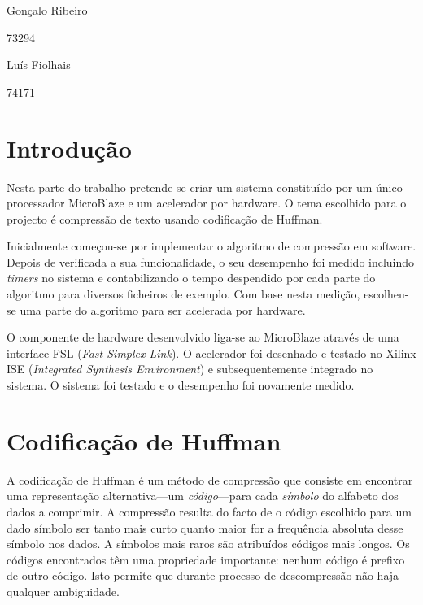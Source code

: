 \documentclass[a4paper]{article}
\begin{document}
	
	
	
	\trSetAuthors
		{
		\begin{center}
		Gonçalo Ribeiro
		
		73294
		\end{center}
		}{
		\begin{center}
		Luís Fiolhais
		
		74171
		\end{center}
		}

	
	\trMakeCover
	
	\tableofcontents
	\pagebreak
	
	\section{Introdução}
	
	Nesta parte do trabalho pretende-se criar um sistema constituído por um único processador MicroBlaze e um acelerador por hardware. O tema escolhido para o projecto é compressão de texto usando codificação de Huffman.
	
	Inicialmente começou-se por implementar o algoritmo de compressão em software. Depois de verificada a sua funcionalidade, o seu desempenho foi medido incluindo \textit{timers} no sistema e contabilizando o tempo despendido por cada parte do algoritmo para diversos ficheiros de exemplo. Com base nesta medição, escolheu-se uma parte do algoritmo para ser acelerada por hardware.
	
	O componente de hardware desenvolvido liga-se ao MicroBlaze através de uma interface FSL (\textit{Fast Simplex Link}). O acelerador foi desenhado e testado no Xilinx ISE (\textit{Integrated Synthesis Environment}) e subsequentemente integrado no sistema. O sistema foi testado e o desempenho foi novamente medido.
	
	\section{Codificação de Huffman}

	A codificação de Huffman é um método de compressão que consiste em encontrar uma representação alternativa---um \emph{código}---para cada \emph{símbolo} do alfabeto dos dados a comprimir. A compressão resulta do facto de o código escolhido para um dado símbolo ser tanto mais curto quanto maior for a frequência absoluta desse símbolo nos dados. A símbolos mais raros são atribuídos códigos mais longos. Os códigos encontrados têm uma propriedade importante: nenhum código é prefixo de outro código. Isto permite que durante processo de descompressão não haja qualquer ambiguidade.
	
\end{document}
